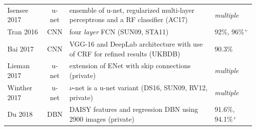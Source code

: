 \documentclass[journal]{IEEEtran}
\begin{document}
\begin{table}[!t]
\begin{minipage}{\textwidth}
\begin{tabularx}{\textwidth}{l c l l}
			Isensee 2017\cite{isensee2017automatic}    & u-net          & ensemble of u-net, regularized multi-layer perceptrons and a RF classifier (AC17)         & \textit{multiple}                                                                                                                                                                                                                                       \\
			Tran 2016\cite{tran2016fully}              & CNN            & four \textit{layer} FCN (SUN09, STA11)                                                    & 92\%, 96\%$^+$                                                                                                                                                                                                                                 \\
			Bai 2017\cite{bai2017semi}                 & CNN            & VGG-16 and DeepLab architecture with use of CRF for refined results (UKBDB)               & 90.3\%                                                                                                                                                                                                                                         \\
			Lieman 2017\cite{lieman2017fastventricle}  & u-net          & extension of ENet\cite{paszke2016enet} with skip connections (private)                    & \textit{multiple}                                                                                                                                                                                                                                       \\
			Winther 2017\cite{winther2017nu}           & u-net          & $\nu$-net is a u-net variant (DS16, SUN09, RV12, private)                                 & \textit{multiple}                                                                                                                                                                                                                                       \\
			Du 2018\cite{du2018deep}                   & DBN            & DAISY features and regression DBN using 2900 images (private)                             & 91.6\%, 94.1\%$^+$                                                                                                                                                                                                                             \\

\end{tabularx}
\end{minipage}
\end{table}
\end{document}
